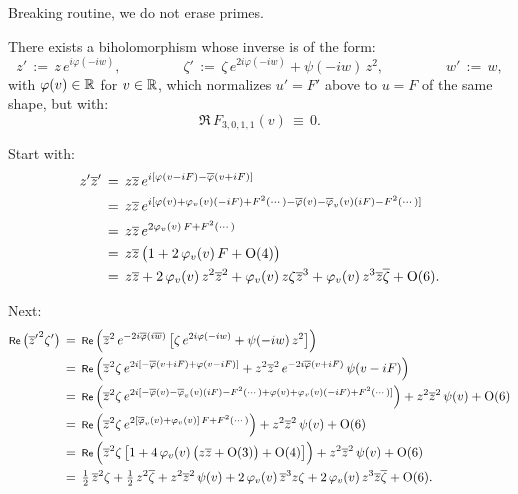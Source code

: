 \documentclass[12pt,twoside,leqno,openany]{amsart}
\begin{document}
Breaking routine, we do not erase primes.

\begin{Lemma}
There exists a biholomorphism whose inverse is of the form:
\[
z'
\,:=\,
z\,e^{i\varphi(-iw)},
\ \ \ \ \ \ \ \ \ \ \ \ \ \ \ \ \ \ \ \
\zeta'
\,:=\,
\zeta\,e^{2i\varphi(-iw)}
+
\psi(-iw)\,z^2,
\ \ \ \ \ \ \ \ \ \ \ \ \ \ \ \ \ \ \ \
w'
\,:=\,
w,
\]
with $\varphi(v) \in \mathbb{R}$ for $v \in \mathbb{R}$, which normalizes
$u' = F'$ above to $u = F$ of the same shape, but with:
\[
\Re\,F_{3,0,1,1}(v)
\,\equiv\,
0.
\]
\end{Lemma}

\proof
Start with:
\[
\aligned
z'\overline{z}'
&
\,=\,
z\overline{z}\,
e^{i[\varphi(v-iF)-\overline{\varphi}(v+iF)]}
\\
&
\,=\,
z\overline{z}\,
e^{i[\varphi(v)+\varphi_v(v)(-iF)+F^2(\cdots)
-\overline{\varphi}(v)-\overline{\varphi}_v(v)(iF)-F^2(\cdots)]}
\\
&
\,=\,
z\overline{z}\,
e^{2\varphi_v(v)\,F+F^2(\cdots)}
\\
&
\,=\,
z\overline{z}\,
\big(
1
+
2\,\varphi_v(v)\,F
+
{\rm O}(4)
\big)
\\
&
\,=\,
z\overline{z}
+
2\,\varphi_v(v)\,z^2\overline{z}^2
+
\varphi_v(v)\,z\zeta\overline{z}^3
+
\varphi_v(v)\,z^3\overline{z}\overline{\zeta}
+
{\rm O}(6).
\endaligned
\]

Next:
\[
\aligned
\Re\,\big({\overline{z}'}^2\zeta'\big)
&
\,=\,
\Re\,
\Big(
\overline{z}^2\,e^{-2i\overline{\varphi}(i\overline{w})}\,
\big[
\zeta\,e^{2i\varphi(-iw)}
+
\psi(-iw)\,z^2
\big]
\Big)
\\
&
\,=\,
\Re\,
\Big(
\overline{z}^2\zeta\,
e^{2i[-\overline{\varphi}(v+iF)+\varphi(v-iF)]}
+
z^2\overline{z}^2\,e^{-2i\overline{\varphi}(v+iF)}\,
\psi(v-iF)
\Big)
\\
&
\,=\,
\Re\,
\Big(
\overline{z}^2\zeta\,
e^{2i[-\overline{\varphi}(v)-\overline{\varphi}_v(v)(iF)-F^2(\cdots)
+\varphi(v)+\varphi_v(v)(-iF)+F^2(\cdots)]}
\Big)
+
z^2\overline{z}^2\,\psi(v)
+
{\rm O}(6)
\\
&
\,=\,
\Re\,
\Big(
\overline{z}^2\zeta\,
e^{2[\overline{\varphi}_v(v)+\varphi_v(v)]\,F+F^2(\cdots)}
\Big)
+
z^2\overline{z}^2\,\psi(v)
+
{\rm O}(6)
\\
&
\,=\,
\Re\,
\Big(
\overline{z}^2\zeta\,
\big[
1
+
4\,\varphi_v(v)\,
\big(
z\overline{z}+{\rm O}(3)
\big)
+
{\rm O}(4)
\big]
\Big)
+
z^2\overline{z}^2\,\psi(v)
+
{\rm O}(6)
\\
&
\,=\,
\tfrac{1}{2}\,
\overline{z}^2\zeta
+
\tfrac{1}{2}\,
z^2\overline{\zeta}
+
z^2\overline{z}^2\,\psi(v)
+
2\,\varphi_v(v)\,
\overline{z}^3z\zeta
+
2\,\varphi_v(v)\,z^3\overline{z}\overline{\zeta}
+
{\rm O}(6).
\endaligned
\]
\end{document}
